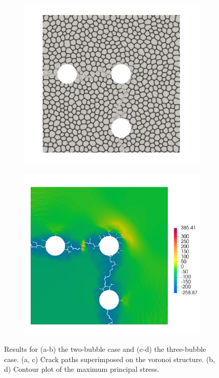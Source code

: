\begin{figure}[htb!]
\begin{subfigure}[t]{0.4\linewidth}
    \caption{}
  \end{subfigure} \\
  \begin{subfigure}[t]{0.4\linewidth}
    \centering
    \includegraphics[width=\linewidth]{Chapter3/figures/three_bubbles_bnd}
    \caption{}
  \end{subfigure}
  \begin{subfigure}[t]{0.4\linewidth}
    \centering
    \includegraphics[width=\linewidth]{Chapter3/figures/three_bubbles_stress}
    \caption{}
  \end{subfigure}
  \caption{Results for (a-b) the two-bubble case and (c-d) the three-bubble case. (a, c) Crack paths superimposed on the voronoi structure. (b, d) Contour plot of the maximum principal stress.}
  \label{fig:compare_bubble_distribution}
\end{figure}

